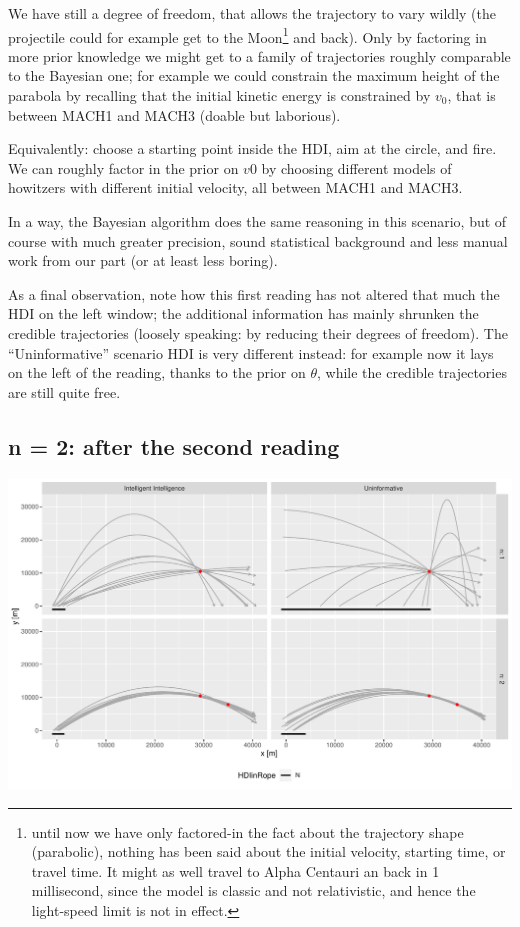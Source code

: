 \documentclass[]{article}
\begin{document}
We have still a degree of freedom, that allows the trajectory to vary
wildly (the projectile could for example get to the Moon\footnote{until
  now we have only factored-in the fact about the trajectory shape
  (parabolic), nothing has been said about the initial velocity,
  starting time, or travel time. It might as well travel to Alpha
  Centauri an back in 1 millisecond, since the model is classic and not
  relativistic, and hence the light-speed limit is not in effect.} and
back). Only by factoring in more prior knowledge we might get to a
family of trajectories roughly comparable to the Bayesian one; for
example we could constrain the maximum height of the parabola by
recalling that the initial kinetic energy is constrained by \(v_0\),
that is between MACH1 and MACH3 (doable but laborious).

Equivalently: choose a starting point inside the HDI, aim at the circle,
and fire. We can roughly factor in the prior on \(v0\) by choosing
different models of howitzers with different initial velocity, all
between MACH1 and MACH3.

In a way, the Bayesian algorithm does the same reasoning in this
scenario, but of course with much greater precision, sound statistical
background and less manual work from our part (or at least less boring).

As a final observation, note how this first reading has not altered that
much the HDI on the left window; the additional information has mainly
shrunken the credible trajectories (loosely speaking: by reducing their
degrees of freedom). The ``Uninformative'' scenario HDI is very
different instead: for example now it lays on the left of the reading,
thanks to the prior on \(\theta\), while the credible trajectories are
still quite free.

\hypertarget{n-2-after-the-second-reading}{%
\subsection{n = 2: after the second
reading}\label{n-2-after-the-second-reading}}

\begin{center}\includegraphics[width=1.0\textwidth]{bayesian_artillery_files/figure-latex/plot_2-1} \end{center}
\end{document}
